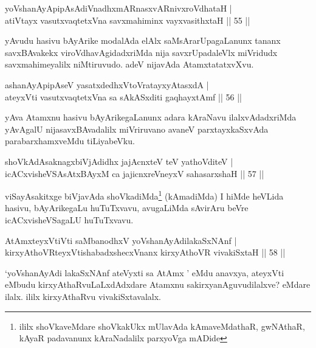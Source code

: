 
\begin{shl}
yoV\s shanAyApipAsAdiVnadhxmARnasxvARnivxroVdhataH |\\
atiVtayx vasutxvaqtetxVna savxmahiminx vayxvasithxtaH \hfill || 55 ||
\end{shl}

\begin{artha}
yAvudu hasivu bAyArike modalAda elAlx saMsArarUpagaLanunx tananx savxBAvakekx viroVdhavAgidadxriMda nija savxrUpadaleVlx miVridudx savxmahimeyalilx niMtiruvudo. adeV nijavAda AtamxtatatxvXvu.
\end{artha}


\begin{shl}
ashanAyApipAseV yasatxdedhxVtoVratayxyAtasxdA |\\
ateyxVti vasutxvaqtetxVna sa sAkASxditi gaqhayxtAmf \hfill || 56 ||
\end{shl}

\begin{artha}
yAva Atamxnu hasivu bAyArikegaLanunx adara kAraNavu ilalxvAdadxriMda yAvAgalU nijasavxBAvadalilx miVriruvano avaneV parxtayxkaSxvAda parabarxhamxveMdu tiLiyabeVku.
\end{artha}

\begin{shl}
shoVkAdAsaknagxbiVjAdidhx jajAcnxteV teV yathoVditeV |\\
icACxvisheVSAsAtxBAyxM ca jajicnxreV\s neyxV sahasarxshaH \hfill || 57 ||
\end{shl}

\begin{artha}
viSayAsakitxge biVjavAda shoVkadiMda\footnote[1]{ililx shoVkaveMdare shoVkakUkx mUlavAda kAmaveMdathaR, gwNAthaR, kAyaR padavanunx kAraNadalilx parxyoVga mADide} (kAmadiMda) I hiMde heVLida hasivu, bAyArikegaLu huTuTxvavu, avugaLiMda sAvirAru beVre icACxvisheVSagaLU huTuTxvavu.
\end{artha}


\begin{shl}
AtAmx\s teyxVtiVti saMbanodhxV yoV\s shanAyAdilakaSxNAnf |\\
kirxyAthoVR\s teyxVtishabadxshecxVnanx kirxyAthoVR vivakiSxtaH \hfill || 58 ||
\end{shl}

\begin{artha}
`yoV\s shanAyAdi lakaSxNAnf ateVyxti sa AtAmx ' eMdu anavxya, ateyxVti eMbudu kirxyAthaRvuLaLxdAdxdare Atamxnu sakirxyanAguvudilalxve? eMdare ilalx. ililx kirxyAthaRvu vivakiSxtavalalx. 
\end{artha}

